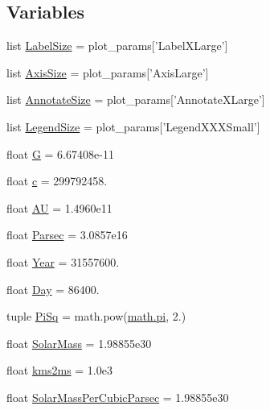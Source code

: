 \subsection*{Variables}
\begin{DoxyCompactItemize}
\item 
list \hyperlink{namespacebinary_s_m_b_h_demo_a5442484cb46fea21b591857bb4612fd0}{Label\-Size} = plot\-\_\-params\mbox{[}'Label\-X\-Large'\mbox{]}
\item 
list \hyperlink{namespacebinary_s_m_b_h_demo_ab529335bcc305d4d0e7f0af5059c8d6b}{Axis\-Size} = plot\-\_\-params\mbox{[}'Axis\-Large'\mbox{]}
\item 
list \hyperlink{namespacebinary_s_m_b_h_demo_a3ab3ad088d56421712dc63fcecbbd080}{Annotate\-Size} = plot\-\_\-params\mbox{[}'Annotate\-X\-Large'\mbox{]}
\item 
list \hyperlink{namespacebinary_s_m_b_h_demo_a37d5e999bcb090b558ab98425ea058f2}{Legend\-Size} = plot\-\_\-params\mbox{[}'Legend\-X\-X\-X\-Small'\mbox{]}
\item 
float \hyperlink{namespacebinary_s_m_b_h_demo_a5dd1de9b7e9291ff2d603fb787279034}{G} = 6.\-67408e-\/11
\item 
float \hyperlink{namespacebinary_s_m_b_h_demo_a8fd5236e1ded5df1f2708d880f1a6c88}{c} = 299792458.
\item 
float \hyperlink{namespacebinary_s_m_b_h_demo_a2ad6e51c36a32ffe33b3384e27ebe378}{A\-U} = 1.\-4960e11
\item 
float \hyperlink{namespacebinary_s_m_b_h_demo_a5d91723e60291fd221a8e96bbbf009c8}{Parsec} = 3.\-0857e16
\item 
float \hyperlink{namespacebinary_s_m_b_h_demo_a0cace76cb6d2734d1d722ab46183b936}{Year} = 31557600.
\item 
float \hyperlink{namespacebinary_s_m_b_h_demo_a3027d7c41b68c3e159cd590cfd049a3b}{Day} = 86400.
\item 
tuple \hyperlink{namespacebinary_s_m_b_h_demo_af37ef2efc0cd6b0b69f996394f5ddf18}{Pi\-Sq} = math.\-pow(\hyperlink{_constants_8cpp_a31c17cc321db72d5ab448b71ea92792f}{math.\-pi}, 2.)
\item 
float \hyperlink{namespacebinary_s_m_b_h_demo_a3c430f8a1571165fd1d3b9180f3e428f}{Solar\-Mass} = 1.\-98855e30
\item 
float \hyperlink{namespacebinary_s_m_b_h_demo_a45b4858d5e1b210896d6e647bfa40f1f}{kms2ms} = 1.\-0e3
\item 
float \hyperlink{namespacebinary_s_m_b_h_demo_ae0c87d5df255efd649e5a21e0bafbbc3}{Solar\-Mass\-Per\-Cubic\-Parsec} = 1.\-98855e30

\end{DoxyCompactItemize}
